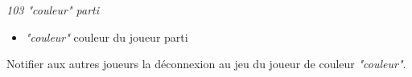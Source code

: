 \par

\textit{103 "couleur" parti}

\begin{itemize}

	\item \textit{"couleur"} 	\tabto{2cm} couleur du joueur parti 
 
\end{itemize} 

Notifier aux autres joueurs la déconnexion au jeu du joueur de couleur \textit{"couleur"}. \\